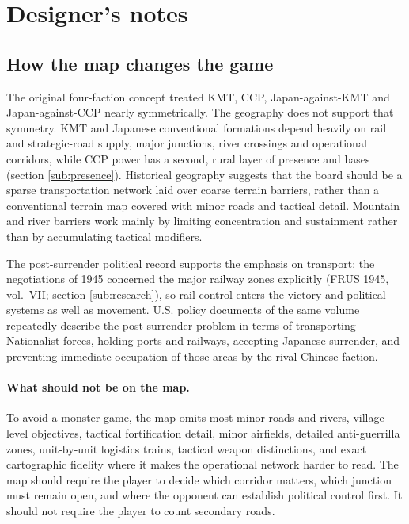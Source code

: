 \documentclass[11pt]{article}
\begin{document}
\section{Designer's notes}\label{sec:notes}
\subsection{How the map changes the game}\label{sub:mapchanges}
The original four-faction concept treated KMT, CCP, Japan-against-KMT and Japan-against-CCP nearly symmetrically. The geography does not support that symmetry. KMT and Japanese conventional formations depend heavily on rail and strategic-road supply, major junctions, river crossings and operational corridors, while CCP power has a second, rural layer of presence and bases (section \ref{sub:presence}). Historical geography suggests that the board should be a sparse transportation network laid over coarse terrain barriers, rather than a conventional terrain map covered with minor roads and tactical detail. Mountain and river barriers work mainly by limiting concentration and sustainment rather than by accumulating tactical modifiers.

The post-surrender political record supports the emphasis on transport: the negotiations of 1945 concerned the major railway zones explicitly (FRUS 1945, vol.\ VII; section \ref{sub:research}), so rail control enters the victory and political systems as well as movement. U.S. policy documents of the same volume repeatedly describe the post-surrender problem in terms of transporting Nationalist forces, holding ports and railways, accepting Japanese surrender, and preventing immediate occupation of those areas by the rival Chinese faction.

\paragraph{What should not be on the map.} To avoid a monster game, the map omits most minor roads and rivers, village-level objectives, tactical fortification detail, minor airfields, detailed anti-guerrilla zones, unit-by-unit logistics trains, tactical weapon distinctions, and exact cartographic fidelity where it makes the operational network harder to read. The map should require the player to decide which corridor matters, which junction must remain open, and where the opponent can establish political control first. It should not require the player to count secondary roads.
\end{document}
